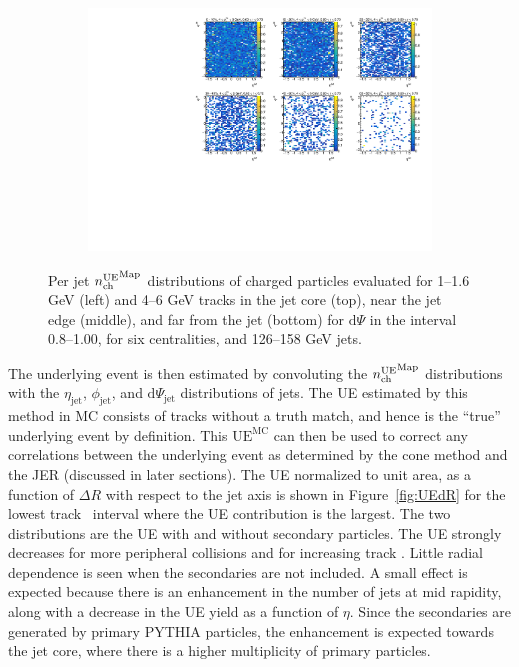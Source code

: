 \begin{figure}
\begin{subfigure}{.5\textwidth}
\centering \includegraphics[width=1\textwidth]{figures/main/UE/eta_phi_map_trk6_dR9}
\caption{}
\end{subfigure}
\caption{Per jet $\mbox{$n_{\mathrm{ch}}^{\mathrm{UE}}$}^{\mathrm{Map}}$ distributions of charged particles evaluated for 1--1.6 GeV (left) and 4--6 GeV tracks in the jet core (top), near the jet edge (middle), and far from the jet (bottom) for  $\mathrm{d}\Psi$ in the interval 0.8--1.00, for six centralities, and 126--158 GeV jets.}
\label{fig:ue_map}
\end{figure}


The underlying event is then estimated by convoluting the $\mbox{$n_{\mathrm{ch}}^{\mathrm{UE}}$}^{\mathrm{Map}}$ distributions with the $\eta_{\mathrm{jet}}$, $\phi_{\mathrm{jet}}$, and $\mathrm{d}\Psi_{\mathrm{jet}}$ distributions of jets.
The UE estimated by this method in MC consists of tracks without a truth match, and hence is the ``true'' underlying event by definition.
This $\mathrm{UE}^{\mathrm{MC}}$ can then be used to correct any correlations between the underlying event as determined by the cone method and the JER (discussed in later sections).
The UE normalized to unit area, as a function of $\Delta R$ with respect to the jet axis is shown in Figure~\ref{fig:UEdR} for the lowest track \pt\ interval where the UE contribution is the largest.
The two distributions are the UE with and without secondary particles.
The UE strongly decreases for more peripheral collisions and for increasing track \pt.
Little radial dependence is seen when the secondaries are not included.
A small effect is expected because there is an enhancement in the number of jets at mid rapidity, along with a decrease in the UE yield as a function of $\eta$.
Since the secondaries are generated by primary PYTHIA particles, the enhancement is expected towards the jet core, where there is a higher multiplicity of primary particles.

